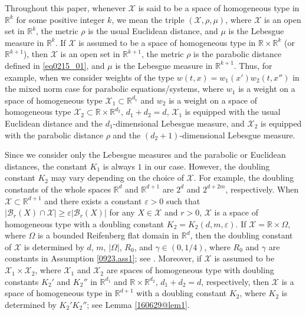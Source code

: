 \documentclass[reqno]{amsart}
\numberwithin{equation}{section}
\theoremstyle{plain}
\theoremstyle{definition}
\theoremstyle{remark}
\begin{document}
Throughout this paper, whenever ${\mathcal{X}}$ is said to be a space of homogeneous type in ${\mathbb{R}}^k$ for some positive integer $k$, we mean the triple $({\mathcal{X}}, \rho, \mu)$, where ${\mathcal{X}}$ is an open set in ${\mathbb{R}}^k$, the metric $\rho$ is the usual Euclidean distance, and $\mu$ is the Lebesgue measure in ${\mathbb{R}}^k$.
If ${\mathcal{X}}$ is assumed to be a space of homogeneous type in ${\mathbb{R}} \times {\mathbb{R}}^k$ (or ${\mathbb{R}}^{k+1}$), then ${\mathcal{X}}$ is an open set in ${\mathbb{R}}^{k+1}$, the metric $\rho$ is the parabolic distance defined in \eqref{eq0215_01}, and $\mu$ is the Lebesgue measure in ${\mathbb{R}}^{k+1}$.
Thus, for example, when we consider weights of the type $w(t,x) = w_1(x') w_2(t,x'')$ in the mixed norm case for parabolic equations/systems,  where $w_1$ is a weight on a space of homogeneous type ${\mathcal{X}}_1\subset {\mathbb{R}}^{d_1}$ and $w_2$ is a weight on a space of homogeneous type ${\mathcal{X}}_2\subset {\mathbb{R}} \times {\mathbb{R}}^{d_2}$, $d_1+ d_2 = d$,  ${\mathcal{X}}_1$  is equipped with the usual Euclidean distance and the $d_1$-dimensional Lebesgue measure, and ${\mathcal{X}}_2$  is equipped with  the parabolic distance $\rho$ and the $(d_2+1)$-dimensional Lebesgue measure.

Since we consider only the Lebesgue measures and the parabolic or Euclidean distances, the constant $K_1$ is always $1$ in our case. However, the doubling constant $K_2$ may vary depending on the choice of ${\mathcal{X}}$.
For example, the doubling constants of the whole spaces ${\mathbb{R}}^d$ and ${\mathbb{R}}^{d+1}$ are $2^d$ and $2^{d+2m}$, respectively.
When ${\mathcal{X}}\subset {\mathbb{R}}^{d+1}$ and there exists a constant $\varepsilon>0$ such that $|{\mathcal{B}}_r(X)\cap {\mathcal{X}} |\ge \varepsilon |{\mathcal{B}}_r(X)|$ for any $X\in {\mathcal{X}}$ and $r>0$, ${\mathcal{X}}$ is a space of homogeneous type with a doubling constant $K_2=K_2(d,m,\varepsilon)$.
If ${\mathcal{X}}={\mathbb{R}}\times \Omega$, where $\Omega$ is a bounded Reifenberg flat domain in ${\mathbb{R}}^d$, then the doubling constant of ${\mathcal{X}}$ is determined by $d$, $m$, $|\Omega|$, $R_0$, and $\gamma\in (0,1/4)$, where $R_0$ and $\gamma$ are constants in Assumption \ref{0923.ass1}; see \cite[Remark 7.3]{arXiv:1603.07844v1}.
Moreover, if ${\mathcal{X}}$ is assumed to be ${\mathcal{X}}_1\times {\mathcal{X}}_2$, where ${\mathcal{X}}_1$ and ${\mathcal{X}}_2$ are spaces of homogeneous type with doubling constants $K_2'$ and $K_2''$ in ${\mathbb{R}}^{d_1}$ and ${\mathbb{R}}\times {\mathbb{R}}^{d_2}$, $d_1+d_2=d$, respectively, 
then ${\mathcal{X}}$ is a space of homogeneous type in ${\mathbb{R}}^{d+1}$ with a doubling constant $K_2$, where $K_2$ is determined by $K_2'K_2''$; see Lemma \ref{160629@lem1}.
\end{document}
